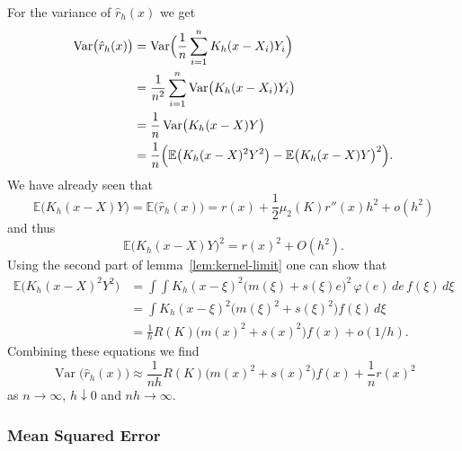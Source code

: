 \documentclass[
  a4paper,
]{article}
\theoremstyle{definition}
\theoremstyle{definition}
\theoremstyle{definition}
\theoremstyle{definition}
\theoremstyle{remark}
\begin{document}
For the variance of \(\hat r_h(x)\) we get
\begin{align*}
  \mathop{\mathrm{Var}}\bigl( \hat r_h(x) \bigr)
  &= \mathop{\mathrm{Var}}\Bigl( \frac1n \sum_{i=1}^n K_h(x - X_i) Y_i \Bigr) \\
  &= \frac{1}{n^2} \sum_{i=1}^n \mathop{\mathrm{Var}}\bigl( K_h(x - X_i) Y_i \bigr) \\
  &= \frac1n \mathop{\mathrm{Var}}\bigl( K_h(x - X) Y \bigr) \\
  &= \frac1n \Bigl( \mathbb{E}\bigl( K_h(x - X)^2 Y^2 \bigr) - \mathbb{E}\bigl( K_h(x - X) Y \bigr)^2 \Bigr).
\end{align*}
We have already seen that
\begin{equation*}
  \mathbb{E}\bigl( K_h(x - X) Y \bigr)
  = \mathbb{E}\bigl( \hat r_h(x) \bigr)
  = r(x) + \frac12 \mu_2(K) r''(x) h^2 + o(h^2)
\end{equation*}
and thus
\begin{equation*}
  \mathbb{E}\bigl( K_h(x - X) Y \bigr)^2
  = r(x)^2 + O(h^2).
\end{equation*}
Using the second part of lemma~\ref{lem:kernel-limit} one can show that
\begin{align*}
  \mathbb{E}\bigl( K_h(x - X)^2 Y^2 \bigr)
  &= \int \int K_h(x - \xi)^2 \bigl( m(\xi) + s(\xi)e \bigr)^2 \,\varphi(e)\,de \,f(\xi)\,d\xi \\
  &= \int K_h(x - \xi)^2 \bigl( m(\xi)^2 + s(\xi)^2 \bigr) f(\xi) \,d\xi \\
  &= \frac1h R(K) \bigl( m(x)^2 + s(x)^2 \bigr) f(x) + o(1/h).
\end{align*}
Combining these equations we find
\begin{equation*}
  \mathop{\mathrm{Var}}\bigl( \hat r_h(x) \bigr)
  \approx \frac{1}{nh} R(K) \bigl( m(x)^2 + s(x)^2 \bigr) f(x)
    + \frac1n r(x)^2
\end{equation*}
as \(n\to\infty\), \(h\downarrow 0\) and \(nh\to\infty\).

\subsubsection*{Mean Squared Error}\label{mean-squared-error-1}
\end{document}
